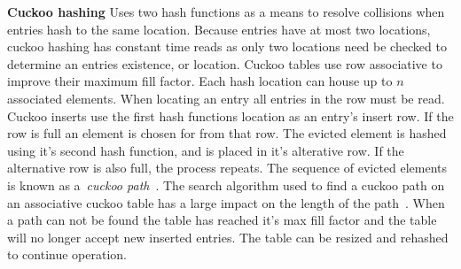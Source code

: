 \textbf{Cuckoo hashing} Uses two hash functions as a means
to resolve collisions when entries hash to the same
location. Because entries have at most two locations, cuckoo
hashing has constant time reads as only two locations need
be checked to determine an entries existence, or location.
Cuckoo tables use row associative to improve their maximum
fill factor. Each hash location can house up to $n$
associated elements. When locating an entry all entries in
the row must be read.  Cuckoo inserts use the first hash
functions location as an entry's insert row. If the row is
full an element is chosen for from that row. The evicted
element is hashed using it's second hash function, and is
placed in it's alterative row. If the alternative row is
also full, the process repeats. The sequence of evicted
elements is known as a~\textit{cuckoo
path}~\cite{cuckoo,memc3,cuckoo-improvements}. The search
algorithm used to find a cuckoo path on an associative
cuckoo table has a large impact on the length of the
path~\cite{cuckoo-improvements}. When a path can not be
found the table has reached it's max fill factor and the
table will no longer accept new inserted entries. The table
can be resized and rehashed to continue operation.

